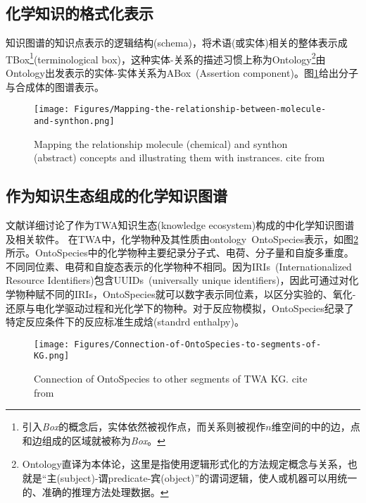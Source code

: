 \subsection{化学知识的格式化表示}
知识图谱的知识点表示的逻辑结构\textrm{(schema)}，将术语(或实体)相关的整体表示成\textrm{TBox}\footnote{引入\textit{Box}的概念后，实体依然被视作点，而关系则被视作$n$维空间的中的边，点和边组成的区域就被称为\textit{Box}。}\textrm{(terminological box)}，这种实体-关系的描述习惯上称为\textrm{Ontology}\footnote{\textrm{Ontology}直译为本体论，这里是指使用逻辑形式化的方法规定概念与关系，也就是“主\textrm{(subject)}-谓\textrm{predicate}-宾\textrm{(object)}”的谓词逻辑，使人或机器可以用统一的、准确的推理方法处理数据。}由\textrm{Ontology}出发表示的实体-实体关系为\textrm{ABox~(Assertion component)}。图\ref{Fig:Mapping-relationship-molecule-synthon}给出分子与合成体的图谱表示。 
\begin{figure}[h!]
\centering
\texttt{[image: Figures/Mapping-the-relationship-between-molecule-and-synthon.png]}
\caption{\small\textrm{Mapping the relationship molecule (chemical) and synthon (abstract) concepts and illustrating them with instrances. cite from~\cite{ACR56-128_2023}}}%
\label{Fig:Mapping-relationship-molecule-synthon}
\end{figure}

\subsection{作为知识生态组成的化学知识图谱}
文献\cite{ACR56-128_2023}详细讨论了作为\textrm{TWA}知识生态\textrm{(knowledge ecosystem)}构成的中化学知识图谱及相关软件。
在\textrm{TWA}中，化学物种及其性质由\textrm{ontology~OntoSpecies}表示，如图\ref{Fig:OntoSpecies-to-segments-TWA}所示。\textrm{OntoSpecies}中的化学物种主要纪录分子式、电荷、分子量和自旋多重度。不同同位素、电荷和自旋态表示的化学物种不相同。因为\textrm{IRIs~(Internationalized Resource Identifiers)}包含\textrm{UUIDs~(universally unique identifiers)}，因此可通过对化学物种赋不同的\textrm{IRIs}，\textrm{OntoSpecies}就可以数字表示同位素，以区分实验的、氧化-还原与电化学驱动过程和光化学下的物种。对于反应物模拟，\textrm{OntoSpecies}纪录了特定反应条件下的反应标准生成焓\textrm{(standrd enthalpy)}。
\begin{figure}[h!]
\centering
\texttt{[image: Figures/Connection-of-OntoSpecies-to-segments-of-KG.png]}
\caption{\small\textrm{Connection of OntoSpecies to other segments of TWA KG. cite from~\cite{ACR56-128_2023}}}%
\label{Fig:OntoSpecies-to-segments-TWA}
\end{figure}


